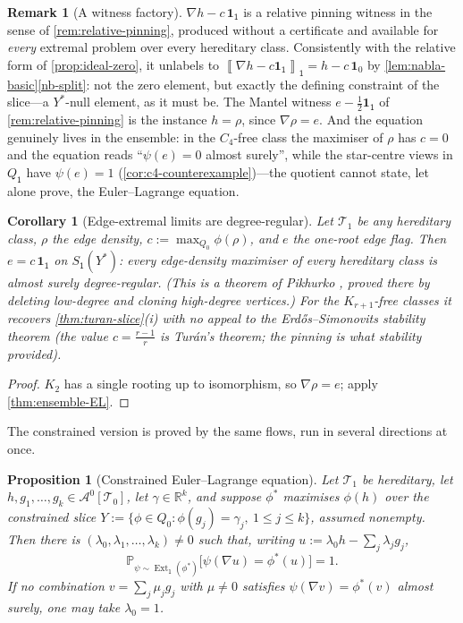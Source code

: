 \documentclass[11pt]{article}
\newtheorem{proposition}[proposition]{Proposition}
\newtheorem{corollary}[corollary]{Corollary}
\theoremstyle{definition}
\newtheorem{remark}[remark]{Remark}
\newcommand{\R}{\mathbb{R}}
\newcommand{\Prob}{\mathbb{P}}
\newcommand{\A}{\mathcal{A}}
\newcommand{\T}{\mathcal{T}}
\newcommand{\Ext}{\operatorname{Ext}}
\newcommand{\avg}[2]{\left\llbracket #1 \right\rrbracket_{#2}}
\newcommand{\one}{\mathbf 1}
\newcommand{\vtype}{\mathsf{1}}
\begin{document}
\begin{remark}[A witness factory]\label{rem:witness-factory}
$\nabla h-c\,\one_\vtype$ is a relative pinning witness in the sense of
\cref{rem:relative-pinning}, produced without a certificate and available for
\emph{every} extremal problem over every hereditary class.  Consistently with the
relative form of \cref{prop:ideal-zero}, it unlabels to
$\avg{\nabla h-c\one_\vtype}{\vtype}=h-c\,\one_0$ by
\cref{lem:nabla-basic}\ref{nb-split}: not the zero element, but exactly the defining
constraint of the slice---a $Y^\ast$-null element, as it must be.  The Mantel witness
$e-\frac12\one_\vtype$ of \cref{rem:relative-pinning} is the instance $h=\rho$,
since $\nabla\rho=e$.  And the equation genuinely lives in the ensemble: in the
$C_4$-free class the maximiser of $\rho$ has $c=0$ and the equation reads
``$\psi(e)=0$ almost surely'', while the star-centre views in $Q_{\vtype}$ have
$\psi(e)=1$ (\cref{cor:c4-counterexample})---the quotient cannot state, let alone
prove, the Euler--Lagrange equation.
\end{remark}

\begin{corollary}[Edge-extremal limits are degree-regular]\label{cor:degree-regular}
Let $\T_1$ be any hereditary class, $\rho$ the edge density, $c:=\max_{Q_0}\phi(\rho)$,
and $e$ the one-root edge flag.  Then $e=c\,\one_{\vtype}$ on
$S_{\vtype}(Y^\ast)$: every edge-density maximiser of every hereditary class is
almost surely degree-regular.  (This is a theorem of Pikhurko
\cite[Lemma 22]{Pikhurko2010}, proved there by deleting low-degree and cloning
high-degree vertices.)  For the $K_{r+1}$-free classes it recovers
\cref{thm:turan-slice}\textup{(i)} with no appeal to the Erd\H{o}s--Simonovits
stability theorem (the \emph{value} $c=\frac{r-1}r$ is Tur\'an's theorem; the pinning
is what stability provided).
\end{corollary}

\begin{proof}
$K_2$ has a single rooting up to isomorphism, so $\nabla\rho=e$;
apply \cref{thm:ensemble-EL}.
\end{proof}

The constrained version is proved by the same flows, run in several directions at once.

\begin{proposition}[Constrained Euler--Lagrange equation]\label{prop:lagrange}
Let $\T_1$ be hereditary, let $h,g_1,\dots,g_k\in\A^0[\T_0]$, let $\gamma\in\R^k$, and
suppose $\phi^\ast$ maximises $\phi(h)$ over the constrained slice
$Y:=\{\phi\in Q_0:\phi(g_j)=\gamma_j,\ 1\le j\le k\}$, assumed nonempty.  Then there is
$(\lambda_0,\lambda_1,\dots,\lambda_k)\neq0$ such that, writing
$u:=\lambda_0h-\sum_{j}\lambda_jg_j$,
\[
  \Prob_{\psi\sim\Ext_{\vtype}(\phi^\ast)}
  \bigl[\psi(\nabla u)=\phi^\ast(u)\bigr]=1 .
\]
If no combination $v=\sum_j\mu_jg_j$ with $\mu\neq0$ satisfies
$\psi(\nabla v)=\phi^\ast(v)$ almost surely, one may take $\lambda_0=1$.
\end{proposition}
\end{document}
